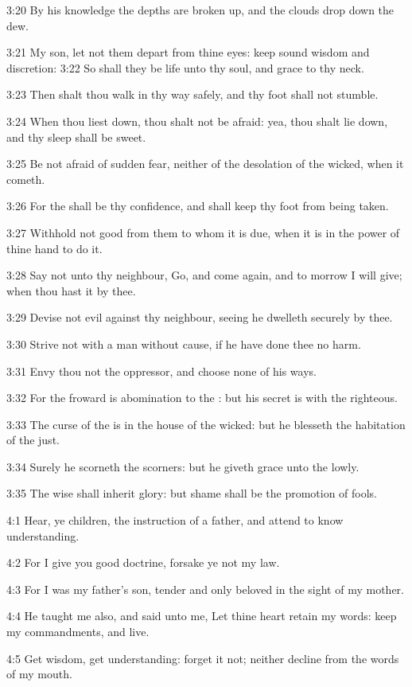 3:20 By his knowledge the depths are broken up, and the clouds drop
down the dew.

3:21 My son, let not them depart from thine eyes: keep sound wisdom
and discretion: 3:22 So shall they be life unto thy soul, and grace to
thy neck.

3:23 Then shalt thou walk in thy way safely, and thy foot shall not
stumble.

3:24 When thou liest down, thou shalt not be afraid: yea, thou shalt
lie down, and thy sleep shall be sweet.

3:25 Be not afraid of sudden fear, neither of the desolation of the
wicked, when it cometh.

3:26 For the \LORD shall be thy confidence, and shall keep thy foot
from being taken.

3:27 Withhold not good from them to whom it is due, when it is in the
power of thine hand to do it.

3:28 Say not unto thy neighbour, Go, and come again, and to morrow I
will give; when thou hast it by thee.

3:29 Devise not evil against thy neighbour, seeing he dwelleth
securely by thee.

3:30 Strive not with a man without cause, if he have done thee no
harm.

3:31 Envy thou not the oppressor, and choose none of his ways.

3:32 For the froward is abomination to the \LORD: but his secret is
with the righteous.

3:33 The curse of the \LORD is in the house of the wicked: but he
blesseth the habitation of the just.

3:34 Surely he scorneth the scorners: but he giveth grace unto the
lowly.

3:35 The wise shall inherit glory: but shame shall be the promotion of
fools.

4:1 Hear, ye children, the instruction of a father, and attend to know
understanding.

4:2 For I give you good doctrine, forsake ye not my law.

4:3 For I was my father's son, tender and only beloved in the sight of
my mother.

4:4 He taught me also, and said unto me, Let thine heart retain my
words: keep my commandments, and live.

4:5 Get wisdom, get understanding: forget it not; neither decline from
the words of my mouth.

